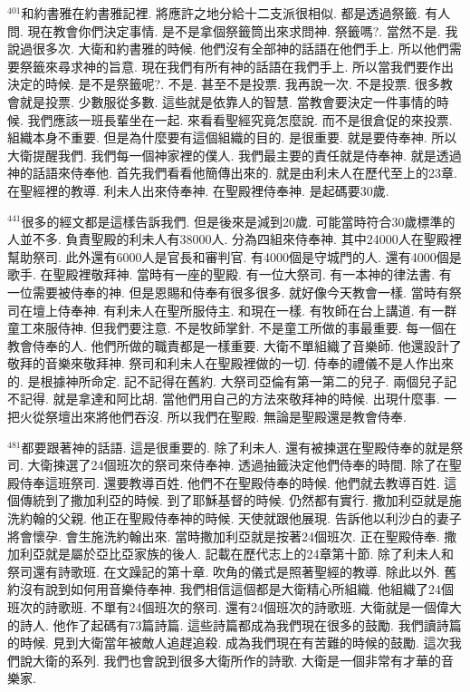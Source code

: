 \documentclass{book}
\begin{document}
$^{401}$和約書雅在約書雅記裡.
將應許之地分給十二支派很相似.
都是透過祭籤.
有人問.
現在教會你們決定事情.
是不是拿個祭籤筒出來求問神.
祭籤嗎?.
當然不是.
我說過很多次.
大衛和約書雅的時候.
他們沒有全部神的話語在他們手上.
所以他們需要祭籤來尋求神的旨意.
現在我們有所有神的話語在我們手上.
所以當我們要作出決定的時候.
是不是祭籤呢?.
不是.
甚至不是投票.
我再說一次.
不是投票.
很多教會就是投票.
少數服從多數.
這些就是依靠人的智慧.
當教會要決定一件事情的時候.
我們應該一班長輩坐在一起.
來看看聖經究竟怎麼說.
而不是很倉促的來投票.
組織本身不重要.
但是為什麼要有這個組織的目的.
是很重要.
就是要侍奉神.
所以大衛提醒我們.
我們每一個神家裡的僕人.
我們最主要的責任就是侍奉神.
就是透過神的話語來侍奉他.
首先我們看看他簡傳出來的.
就是由利未人在歷代至上的23章.
在聖經裡的教導.
利未人出來侍奉神.
在聖殿裡侍奉神.
是起碼要30歲.

$^{441}$很多的經文都是這樣告訴我們.
但是後來是減到20歲.
可能當時符合30歲標準的人並不多.
負責聖殿的利未人有38000人.
分為四組來侍奉神.
其中24000人在聖殿裡幫助祭司.
此外還有6000人是官長和審判官.
有4000個是守城門的人.
還有4000個是歌手.
在聖殿裡敬拜神.
當時有一座的聖殿.
有一位大祭司.
有一本神的律法書.
有一位需要被侍奉的神.
但是恩賜和侍奉有很多很多.
就好像今天教會一樣.
當時有祭司在壇上侍奉神.
有利未人在聖所服侍主.
和現在一樣.
有牧師在台上講道.
有一群童工來服侍神.
但我們要注意.
不是牧師掌針.
不是童工所做的事最重要.
每一個在教會侍奉的人.
他們所做的職責都是一樣重要.
大衛不單組織了音樂師.
他還設計了敬拜的音樂來敬拜神.
祭司和利未人在聖殿裡做的一切.
侍奉的禮儀不是人作出來的.
是根據神所命定.
記不記得在舊約.
大祭司亞倫有第一第二的兒子.
兩個兒子記不記得.
就是拿達和阿比胡.
當他們用自己的方法來敬拜神的時候.
出現什麼事.
一把火從祭壇出來將他們吞沒.
所以我們在聖殿.
無論是聖殿還是教會侍奉.

$^{481}$都要跟著神的話語.
這是很重要的.
除了利未人.
還有被揀選在聖殿侍奉的就是祭司.
大衛揀選了24個班次的祭司來侍奉神.
透過抽籤決定他們侍奉的時間.
除了在聖殿侍奉這班祭司.
還要教導百姓.
他們不在聖殿侍奉的時候.
他們就去教導百姓.
這個傳統到了撒加利亞的時候.
到了耶穌基督的時候.
仍然都有實行.
撒加利亞就是施洗約翰的父親.
他正在聖殿侍奉神的時候.
天使就跟他展現.
告訴他以利沙白的妻子將會懷孕.
會生施洗約翰出來.
當時撒加利亞就是按著24個班次.
正在聖殿侍奉.
撒加利亞就是屬於亞比亞家族的後人.
記載在歷代志上的24章第十節.
除了利未人和祭司還有詩歌班.
在文躁記的第十章.
吹角的儀式是照著聖經的教導.
除此以外.
舊約沒有說到如何用音樂侍奉神.
我們相信這個都是大衛精心所組織.
他組織了24個班次的詩歌班.
不單有24個班次的祭司.
還有24個班次的詩歌班.
大衛就是一個偉大的詩人.
他作了起碼有73篇詩篇.
這些詩篇都成為我們現在很多的鼓勵.
我們讀詩篇的時候.
見到大衛當年被敵人追趕追殺.
成為我們現在有苦難的時候的鼓勵.
這次我們說大衛的系列.
我們也會說到很多大衛所作的詩歌.
大衛是一個非常有才華的音樂家.
\end{document}
